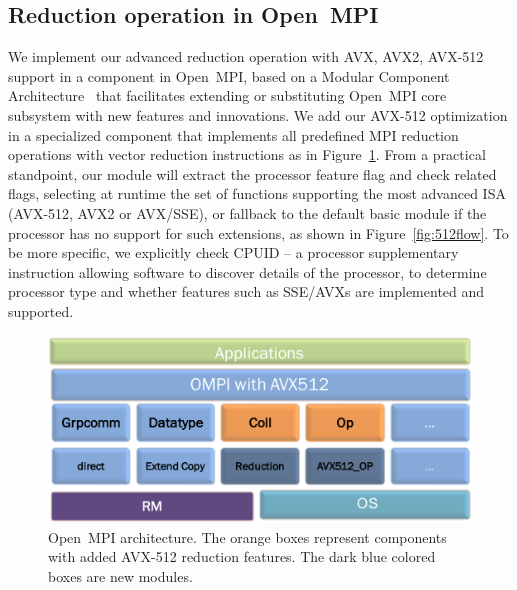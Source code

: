 \documentclass[sigconf]{acmart}
\newcommand{\ompi}[0]{Open~MPI\xspace}
\begin{document}
\subsection{Reduction operation in \ompi}
We implement our advanced reduction operation with AVX, AVX2, AVX-512
support in a component in \ompi, based on a Modular Component
Architecture~\cite{dong_prrte} that facilitates extending or
substituting \ompi core subsystem with new features and innovations.
We add our AVX-512 optimization in a specialized component that
implements all predefined MPI reduction operations with vector
reduction instructions as in Figure~\ref{fig:avx_mca}. From a
practical standpoint, our module will extract the processor
feature flag and check related flags, selecting at runtime the set of
functions supporting the most advanced ISA (AVX-512, AVX2 or AVX/SSE),
or fallback to the default basic module if the processor has no
support for such extensions, as shown in Figure~\ref{fig:512flow}.
%
To be more specific, we explicitly check CPUID -- a processor
supplementary instruction allowing software to discover details of the
processor, to determine processor type and whether features such as
SSE/AVXs are implemented and supported.

\begin{figure}[h]
    \centering
    \includegraphics[width=\linewidth]{avx-mca.pdf}
    \caption{\ompi architecture. The orange boxes represent components with added AVX-512 reduction features. The dark blue colored boxes are new modules.}
    \label{fig:avx_mca}
\end{figure}
\end{document}
